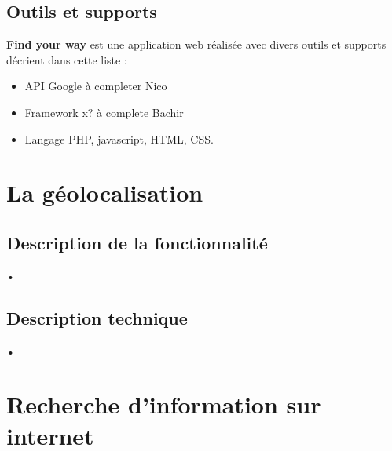 \documentclass[10pt,a4paper]{report}
\begin{document}
\subsection{Outils et supports}

\begin{flushleft}
\textbf{Find your way} est une application web réalisée avec divers outils et supports décrient dans cette liste :

\begin{itemize}

\item API Google à completer Nico 

\item Framework x?  à complete Bachir

\item Langage PHP, javascript, HTML, CSS. 

\end{itemize}
\end{flushleft}


\section{La géolocalisation}

\subsection{Description de la fonctionnalité}
\begin{flushleft}
•
\end{flushleft}

\subsection{Description technique}
\begin{flushleft}
•
\end{flushleft}



\section{Recherche d'information sur internet}
\end{document}
